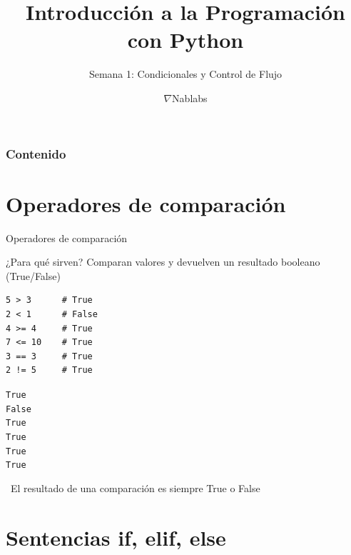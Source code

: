 \documentclass{beamer}
\title{\textbf{Introducción a la Programación con Python}}
\subtitle{Semana 1: Condicionales y Control de Flujo}
\author{$\nabla$Nablabs}
\date{}
\begin{document}
\begin{frame}
\titlepage
\end{frame}

\begin{frame}
\frametitle{Contenido}
\tableofcontents
\end{frame}

\section{Operadores de comparación}

\begin{frame}[fragile]{Operadores de comparación \ \faBalanceScale}
\begin{conceptbox}{¿Para qué sirven?}
Comparan valores y devuelven un resultado booleano (True/False)
\end{conceptbox}

\begin{lstlisting}
5 > 3      # True
2 < 1      # False
4 >= 4     # True
7 <= 10    # True
3 == 3     # True
2 != 5     # True
\end{lstlisting}

\vspace{-0.2cm}
\begin{tcolorbox}[colback=green!10,colframe=green,title={\small\faArrowCircleRight \ Salida esperada},coltitle=fg0,left=3pt,right=3pt,top=2pt,bottom=2pt,boxsep=1pt]
\small\texttt{True\\
False\\
True\\
True\\
True\\
True}
\end{tcolorbox}

\vspace{-0.1cm}
\begin{notebox}
\small\faInfoCircle \ El resultado de una comparación es siempre True o False
\end{notebox}
\end{frame}

\section{Sentencias if, elif, else}
\end{document}

